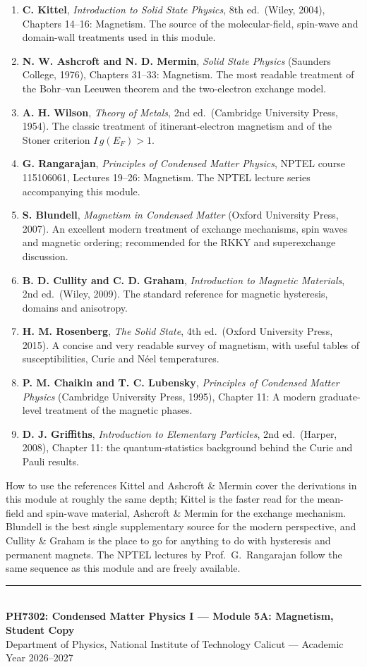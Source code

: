 \documentclass[11pt,a4paper]{article}
\begin{document}
\begin{enumerate}[leftmargin=1.8cm, itemsep=2pt]
    \item \textbf{C. Kittel}, \emph{Introduction to Solid State Physics}, 8th ed.\ (Wiley, 2004), Chapters 14--16: Magnetism. The source of the molecular-field, spin-wave and domain-wall treatments used in this module.
    \item \textbf{N. W. Ashcroft and N. D. Mermin}, \emph{Solid State Physics} (Saunders College, 1976), Chapters 31--33: Magnetism. The most readable treatment of the Bohr--van Leeuwen theorem and the two-electron exchange model.
    \item \textbf{A. H. Wilson}, \emph{Theory of Metals}, 2nd ed.\ (Cambridge University Press, 1954). The classic treatment of itinerant-electron magnetism and of the Stoner criterion $I\,g(E_F) > 1$.
    \item \textbf{G. Rangarajan}, \emph{Principles of Condensed Matter Physics}, NPTEL course 115106061, Lectures 19--26: Magnetism. The NPTEL lecture series accompanying this module.
    \item \textbf{S. Blundell}, \emph{Magnetism in Condensed Matter} (Oxford University Press, 2007). An excellent modern treatment of exchange mechanisms, spin waves and magnetic ordering; recommended for the RKKY and superexchange discussion.
    \item \textbf{B. D. Cullity and C. D. Graham}, \emph{Introduction to Magnetic Materials}, 2nd ed.\ (Wiley, 2009). The standard reference for magnetic hysteresis, domains and anisotropy.
    \item \textbf{H. M. Rosenberg}, \emph{The Solid State}, 4th ed.\ (Oxford University Press, 2015). A concise and very readable survey of magnetism, with useful tables of susceptibilities, Curie and N\'eel temperatures.
    \item \textbf{P. M. Chaikin and T. C. Lubensky}, \emph{Principles of Condensed Matter Physics} (Cambridge University Press, 1995), Chapter 11: A modern graduate-level treatment of the magnetic phases.
    \item \textbf{D. J. Griffiths}, \emph{Introduction to Elementary Particles}, 2nd ed.\ (Harper, 2008), Chapter 11: the quantum-statistics background behind the Curie and Pauli results.
\end{enumerate}

\vspace{0.4cm}
\begin{takeawaybox}{How to use the references}
Kittel and Ashcroft \& Mermin cover the derivations in this module at roughly the same depth; Kittel is the faster read for the mean-field and spin-wave material, Ashcroft \& Mermin for the exchange mechanism. Blundell is the best single supplementary source for the modern perspective, and Cullity \& Graham is the place to go for anything to do with hysteresis and permanent magnets. The NPTEL lectures by Prof.\ G.\ Rangarajan follow the same sequence as this module and are freely available.
\end{takeawaybox}

\vspace{0.6cm}
\begin{center}
\rule{0.5\textwidth}{0.4pt}\\[0.4em]
{\small\color{primary}\textbf{PH7302: Condensed Matter Physics I --- Module 5A: Magnetism, Student Copy}}\\[0.2em]
{\small Department of Physics, National Institute of Technology Calicut --- Academic Year 2026--2027}
\end{center}
\end{document}
